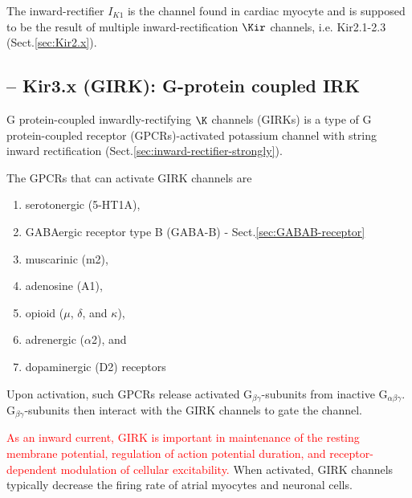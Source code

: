 The inward-rectifier $I_{K1}$ is the channel found in cardiac myocyte  and is
supposed to be the result of multiple inward-rectification $\Kir$ channels, i.e.
Kir2.1-2.3 (Sect.\ref{sec:Kir2.x}).


\subsection{-- Kir3.x (GIRK): G-protein coupled IRK}
\label{sec:Kir_GIRK}
\label{sec:Kir3.x}
\label{sec:GIRK}
\label{sec:Kir3.0}


G protein-coupled inwardly-rectifying $\K$ channels (GIRKs) is a type of G
protein-coupled receptor (GPCRs)-activated potassium channel with string inward
rectification (Sect.\ref{sec:inward-rectifier-strongly}).

The GPCRs that can activate GIRK channels are \citep{yamada1998}
\begin{enumerate}
  \item serotonergic (5-HT1A), 
  
  \item GABAergic receptor type B (GABA-B) - Sect.\ref{sec:GABAB-receptor} 
  
  \item muscarinic (m2), 
  
  \item adenosine (A1), 
  
  \item opioid ($\mu$, $\delta$, and $\kappa$),
  
  \item adrenergic ($\alpha$2), and 
  
  \item dopaminergic (D2) receptors
\end{enumerate}

Upon activation, such  GPCRs release activated G$_{\beta\gamma}$-subunits from
inactive G$_{\alpha\beta\gamma}$. G$_{\beta\gamma}$-subunits then interact with
the GIRK channels to gate the channel.

\textcolor{red}{As an inward current, GIRK is important in maintenance of the
resting membrane potential, regulation of action potential duration, and
receptor-dependent modulation of cellular excitability.}
When activated, GIRK channels typically decrease the firing rate of
atrial myocytes and neuronal cells.


